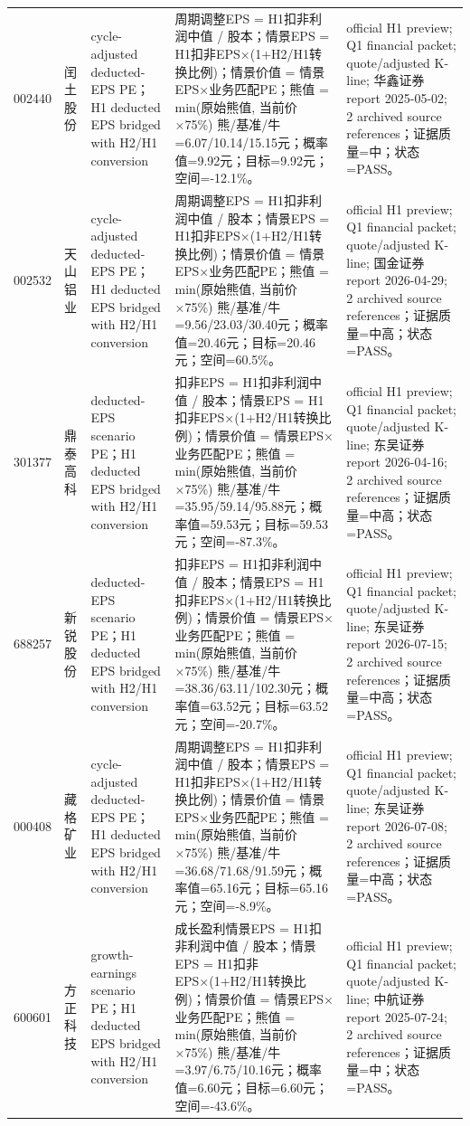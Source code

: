 \begin{longtable}{L{0.85cm}L{1.55cm}L{2.25cm}L{6.0cm}L{4.0cm}}
002440 & 闰土股份 & cycle-adjusted deducted-EPS PE；H1 deducted EPS bridged with H2/H1 conversion & 周期调整EPS = H1扣非利润中值 / 股本；情景EPS = H1扣非EPS×(1+H2/H1转换比例)；情景价值 = 情景EPS×业务匹配PE；熊值 = min(原始熊值, 当前价×75\%) 熊/基准/牛=6.07/10.14/15.15元；概率值=9.92元；目标=9.92元；空间=-12.1\%。 & official H1 preview; Q1 financial packet; quote/adjusted K-line; 华鑫证券 report 2025-05-02; 2 archived source references；证据质量=中；状态=PASS。 \\
002532 & 天山铝业 & cycle-adjusted deducted-EPS PE；H1 deducted EPS bridged with H2/H1 conversion & 周期调整EPS = H1扣非利润中值 / 股本；情景EPS = H1扣非EPS×(1+H2/H1转换比例)；情景价值 = 情景EPS×业务匹配PE；熊值 = min(原始熊值, 当前价×75\%) 熊/基准/牛=9.56/23.03/30.40元；概率值=20.46元；目标=20.46元；空间=60.5\%。 & official H1 preview; Q1 financial packet; quote/adjusted K-line; 国金证券 report 2026-04-29; 2 archived source references；证据质量=中高；状态=PASS。 \\
301377 & 鼎泰高科 & deducted-EPS scenario PE；H1 deducted EPS bridged with H2/H1 conversion & 扣非EPS = H1扣非利润中值 / 股本；情景EPS = H1扣非EPS×(1+H2/H1转换比例)；情景价值 = 情景EPS×业务匹配PE；熊值 = min(原始熊值, 当前价×75\%) 熊/基准/牛=35.95/59.14/95.88元；概率值=59.53元；目标=59.53元；空间=-87.3\%。 & official H1 preview; Q1 financial packet; quote/adjusted K-line; 东吴证券 report 2026-04-16; 2 archived source references；证据质量=中高；状态=PASS。 \\
688257 & 新锐股份 & deducted-EPS scenario PE；H1 deducted EPS bridged with H2/H1 conversion & 扣非EPS = H1扣非利润中值 / 股本；情景EPS = H1扣非EPS×(1+H2/H1转换比例)；情景价值 = 情景EPS×业务匹配PE；熊值 = min(原始熊值, 当前价×75\%) 熊/基准/牛=38.36/63.11/102.30元；概率值=63.52元；目标=63.52元；空间=-20.7\%。 & official H1 preview; Q1 financial packet; quote/adjusted K-line; 东吴证券 report 2026-07-15; 2 archived source references；证据质量=中高；状态=PASS。 \\
000408 & 藏格矿业 & cycle-adjusted deducted-EPS PE；H1 deducted EPS bridged with H2/H1 conversion & 周期调整EPS = H1扣非利润中值 / 股本；情景EPS = H1扣非EPS×(1+H2/H1转换比例)；情景价值 = 情景EPS×业务匹配PE；熊值 = min(原始熊值, 当前价×75\%) 熊/基准/牛=36.68/71.68/91.59元；概率值=65.16元；目标=65.16元；空间=-8.9\%。 & official H1 preview; Q1 financial packet; quote/adjusted K-line; 东吴证券 report 2026-07-08; 2 archived source references；证据质量=中高；状态=PASS。 \\
600601 & 方正科技 & growth-earnings scenario PE；H1 deducted EPS bridged with H2/H1 conversion & 成长盈利情景EPS = H1扣非利润中值 / 股本；情景EPS = H1扣非EPS×(1+H2/H1转换比例)；情景价值 = 情景EPS×业务匹配PE；熊值 = min(原始熊值, 当前价×75\%) 熊/基准/牛=3.97/6.75/10.16元；概率值=6.60元；目标=6.60元；空间=-43.6\%。 & official H1 preview; Q1 financial packet; quote/adjusted K-line; 中航证券 report 2025-07-24; 2 archived source references；证据质量=中；状态=PASS。 \\

\end{longtable}
